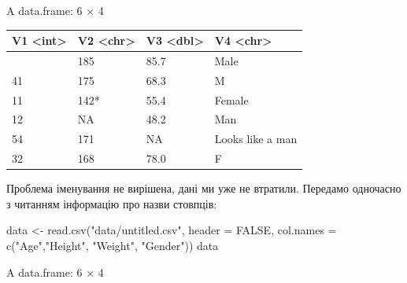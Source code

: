 \documentclass[
  letterpaper,
  DIV=11,
  numbers=noendperiod]{scrreprt}
\newenvironment{Shaded}{\begin{snugshade}}{\end{snugshade}}
\newcommand{\AttributeTok}[1]{\textcolor[rgb]{0.40,0.45,0.13}{#1}}
\newcommand{\ConstantTok}[1]{\textcolor[rgb]{0.56,0.35,0.01}{#1}}
\newcommand{\FunctionTok}[1]{\textcolor[rgb]{0.28,0.35,0.67}{#1}}
\newcommand{\NormalTok}[1]{\textcolor[rgb]{0.00,0.23,0.31}{#1}}
\newcommand{\OtherTok}[1]{\textcolor[rgb]{0.00,0.23,0.31}{#1}}
\newcommand{\StringTok}[1]{\textcolor[rgb]{0.13,0.47,0.30}{#1}}
\begin{document}
A data.frame: 6 × 4

\begin{longtable}[]{@{}llll@{}}
\toprule\noalign{}
V1 \textless int\textgreater{} & V2 \textless chr\textgreater{} & V3
\textless dbl\textgreater{} & V4 \textless chr\textgreater{} \\
\midrule\noalign{}
\endhead
\bottomrule\noalign{}
\endlastfoot
23 & 185 & 85.7 & Male \\
41 & 175 & 68.3 & M \\
11 & 142* & 55.4 & Female \\
12 & NA & 48.2 & Man \\
54 & 171 & NA & Looks like a man \\
32 & 168 & 78.0 & F \\
\end{longtable}

Проблема іменування не вирішена, дані ми уже не втратили. Передамо
одночасно з читанням інформацію про назви стовпців:

\begin{Shaded}
\begin{Highlighting}[]
\NormalTok{data }\OtherTok{\textless{}{-}} \FunctionTok{read.csv}\NormalTok{(}\StringTok{"data/untitled.csv"}\NormalTok{, }
            \AttributeTok{header =} \ConstantTok{FALSE}\NormalTok{,}
            \AttributeTok{col.names =} \FunctionTok{c}\NormalTok{(}\StringTok{"Age"}\NormalTok{,}\StringTok{"Height"}\NormalTok{, }\StringTok{"Weight"}\NormalTok{, }\StringTok{"Gender"}\NormalTok{))}
\NormalTok{data}
\end{Highlighting}
\end{Shaded}

A data.frame: 6 × 4
\end{document}
